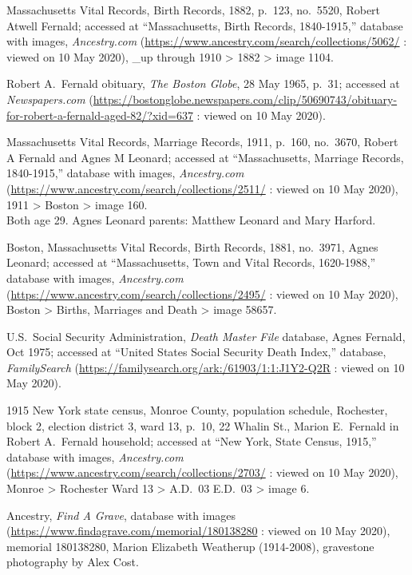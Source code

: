 \begin{thebibliography}{999}
	Massachusetts Vital Records, Birth Records, 1882, p.\ 123, no.\ 5520, Robert Atwell Fernald; accessed at ``Massachusetts, Birth Records, 1840-1915,'' database with images, \textit{Ancestry.com} (\url{https://www.ancestry.com/search/collections/5062/} : viewed on 10 May 2020), \_up through 1910 > 1882 > image 1104.
	
	Robert A.\ Fernald obituary, \textit{The Boston Globe}, 28 May 1965, p.\ 31; accessed at \textit{Newspapers.com} (\url{https://bostonglobe.newspapers.com/clip/50690743/obituary-for-robert-a-fernald-aged-82/?xid=637} : viewed on 10 May 2020).
	
	Massachusetts Vital Records, Marriage Records, 1911, p.\ 160, no.\ 3670, Robert A Fernald and Agnes M Leonard; accessed at ``Massachusetts, Marriage Records, 1840-1915,'' database with images, \textit{Ancestry.com} (\url{https://www.ancestry.com/search/collections/2511/} : viewed on 10 May 2020), 1911 > Boston > image 160.\\
	Both age 29. Agnes Leonard parents: Matthew Leonard and Mary Harford.
	
	Boston, Massachusetts Vital Records, Birth Records, 1881, no.\ 3971, Agnes Leonard; accessed at ``Massachusetts, Town and Vital Records, 1620-1988,'' database with images, \textit{Ancestry.com} (\url{https://www.ancestry.com/search/collections/2495/} : viewed on 10 May 2020), Boston > Births, Marriages and Death > image 58657.
	
	U.S.\ Social Security Administration, \textit{Death Master File} database, Agnes Fernald, Oct 1975; accessed at ``United States Social Security Death Index,'' database, \textit{FamilySearch} (\url{https://familysearch.org/ark:/61903/1:1:J1Y2-Q2R} : viewed on 10 May 2020).
	
	1915 New York state census, Monroe County, population schedule, Rochester, block 2, election district 3, ward 13, p.\ 10, 22 Whalin St., Marion E.\ Fernald in Robert A.\ Fernald household; accessed at ``New York, State Census, 1915,'' database with images, \textit{Ancestry.com} (\url{https://www.ancestry.com/search/collections/2703/} : viewed on 10 May 2020), Monroe > Rochester Ward 13 > A.D.\ 03 E.D.\ 03 > image 6.
	
	Ancestry, \textit{Find A Grave}, database with images (\url{https://www.findagrave.com/memorial/180138280} : viewed on 10 May 2020), memorial 180138280, Marion Elizabeth Weatherup (1914-2008), gravestone photography by Alex Cost.
	

\end{thebibliography}
